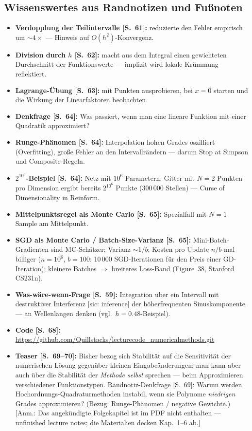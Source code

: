 \subsection{Wissenswertes aus Randnotizen und Fu{\ss}noten}
\begin{itemize}[itemsep=2pt]
  \item \textbf{Verdopplung der Teilintervalle [S.~61]:} reduzierte den Fehler
        empirisch um $\sim 4\times$ --- Hinweis auf $O(h^2)$-Konvergenz.
  \item \textbf{Division durch $h$ [S.~62]:} macht aus dem Integral einen gewichteten
        Durchschnitt der Funktionswerte --- implizit wird lokale Krümmung
        reflektiert.
  \item \textbf{Lagrange-Übung [S.~63]:} mit Punkten ausprobieren, bei $x = 0$
        starten und die Wirkung der Linearfaktoren beobachten.
  \item \textbf{Denkfrage [S.~64]:} Was passiert, wenn man eine lineare Funktion mit
        einer Quadratik approximiert?
  \item \textbf{Runge-Phänomen [S.~64]:} Interpolation hohen Grades oszilliert
        (Overfitting), gro{\ss}e Fehler an den Intervallrändern --- darum
        \glqq Stop at Simpson\grqq{} und Composite-Regeln.
  \item \textbf{$2^{10^6}$-Beispiel [S.~64]:} Netz mit $10^6$ Parametern: Gitter mit
        $N = 2$ Punkten pro Dimension ergibt bereits $2^{10^6}$ Punkte (300\,000
        Stellen) --- Curse of Dimensionality in Reinform.
  \item \textbf{Mittelpunktsregel als Monte Carlo [S.~65]:} Spezialfall mit $N = 1$
        Sample am Mittelpunkt.
  \item \textbf{SGD als Monte Carlo / Batch-Size-Varianz [S.~65]:} Mini-Batch-
        Gradienten sind MC-Schätzer; Varianz $\sim 1/b$; Kosten pro Update
        $n/b$-mal billiger ($n = 10^6$, $b = 100$: 10\,000 SGD-Iterationen für den
        Preis einer GD-Iteration); kleinere Batches $\Rightarrow$ breiteres
        Loss-Band (Figure~38, Stanford CS231n).
  \item \textbf{Was-wäre-wenn-Frage [S.~59]:} Integration über ein Intervall mit
        destruktiver Interferenz [sic: \glqq inference\grqq] der höherfrequenten
        Sinuskomponente --- an Wellenlängen denken (vgl.\ $h = 0.48$-Beispiel).
  \item \textbf{Code [S.~68]:}
        \url{https://github.com/Quillstacks/lecturecode_numericalmethods.git}
  \item \textbf{Teaser [S.~69--70]:} Bisher bezog sich Stabilität auf die
        Sensitivität der numerischen Lösung gegenüber kleinen Eingabeänderungen; man
        kann aber auch über die Stabilität der \emph{Methode selbst} sprechen ---
        beim Approximieren verschiedener Funktionstypen. Randnotiz-Denkfrage [S.~69]:
        Warum werden Hochordnungs-Quadraturmethoden instabil, wenn sie Polynome
        \emph{niedrigen} Grades approximieren? (Bezug: Runge-Phänomen / negative
        Gewichte.) [Anm.: Das angekündigte Folgekapitel ist im PDF nicht enthalten
        --- \glqq unfinished lecture notes\grqq; die Materialien decken Kap.~1--6 ab.]
\end{itemize}

